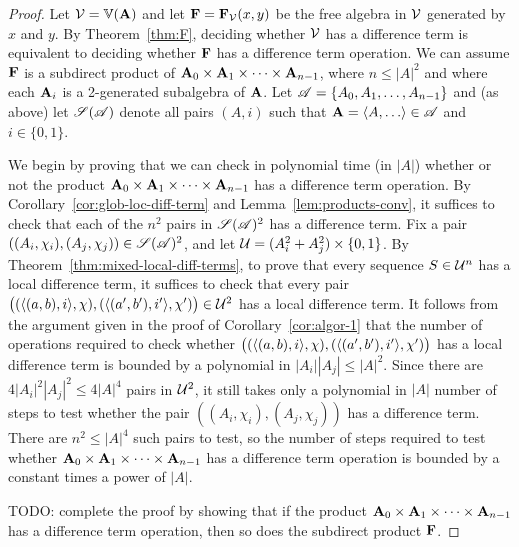 \begin{proof}
  Let $\mathcal{V} = \operatorname{\mathbb{V}}(\mathbf{A})$ and let $\mathbf{F} = \mathbf{F}_{\mathcal{V}}(x,y)$ be the free algebra in
  $\mathcal{V}$ generated by $x$ and $y$.
  By Theorem~\ref{thm:F}, deciding whether $\mathcal{V}$ has a difference term is equivalent to
  deciding whether $\mathbf{F}$ has a difference term operation.
  We can assume $\mathbf{F}$ is a subdirect product of
  $\mathbf{A}_0 \times \mathbf{A}_1 \times \cdots \times \mathbf{A}_{n-1}$, where $n\leq |A|^2$ and
  where each $\mathbf{A}_i$ is a 2-generated subalgebra of $\mathbf{A}$.
  Let $\mathscr{A} = \{A_0, A_1, \dots, A_{n-1}\}$ and (as above) let $\mathscr{S}(\mathscr{A})$ denote
  all pairs $(A, i)$ such that $\bA = \<A, \dots\> \in \scA$ and $i\in \{0,1\}$.

  We begin by proving that we can check in polynomial time (in $|A|$)
  whether or not the product
  $\mathbf{A}_0 \times \mathbf{A}_1 \times \cdots \times \mathbf{A}_{n-1}$ has a difference term operation.
  By Corollary~\ref{cor:glob-loc-diff-term} and Lemma~\ref{lem:products-conv},
  it suffices to check that each of the
  $n^2$ pairs  in
  $\mathscr{S}(\mathscr{A})^2$ has a \glocal
  difference term.  Fix a pair
  $((A_i, \chi_i), (A_j, \chi_j)) \in  \mathscr{S}(\mathscr{A})^2$,
  and let $\mathcal{U}  = (A_i^2 + A_j^2)\times \{0,1\}$.
  By Theorem~\ref{thm:mixed-local-diff-terms},
  to prove that every sequence $S \in \mathcal{U}^n$
  has a local difference term, it suffices to check that every pair
  $\bigl( (\langle(a, b), i\rangle, \chi), (\langle(a', b'), i'\rangle, \chi')\bigr) \in \mathcal{U}^2$
  has a local difference term. It follows from the argument given
  in the proof of Corollary~\ref{cor:algor-1} that the number of
  operations required to check whether
  $\bigl( (\langle(a, b), i\rangle, \chi), (\langle(a', b'), i'\rangle, \chi')\bigr)$
  has a local difference term is bounded by a
  polynomial in $|A_i||A_j|\leq |A|^2$.  Since there are
  $4|A_i|^2|A_j|^2 \leq 4|A|^4$ pairs in $\mathcal{U}^2$,
  it still takes only a polynomial in $|A|$ number of steps to test whether
  the pair $((A_i, \chi_i), (A_j, \chi_j))$ has a \glocal difference term.
  There are $n^2 \leq |A|^4$ such pairs to test, so the number of steps required to
  test whether
  $\mathbf{A}_0 \times \mathbf{A}_1 \times \cdots \times \mathbf{A}_{n-1}$ has a difference term
  operation is bounded by a constant times a power of $|A|$.

  \medskip

  \noindent TODO: complete the proof by showing that if the product
  $\mathbf{A}_0 \times \mathbf{A}_1 \times \cdots \times \mathbf{A}_{n-1}$ has a difference term operation,
  then so does the subdirect product $\mathbf{F}$.
\end{proof}


